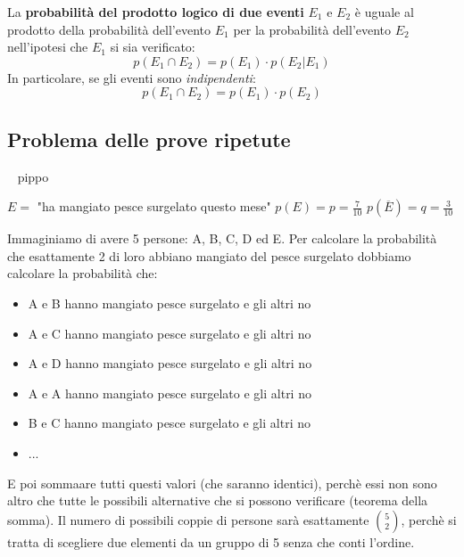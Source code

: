 \documentclass{article}     %
\begin{document}
                \begin{shadedTheorem}
                    La \textbf{probabilità del prodotto logico di due eventi} $E_1$ e $E_2$ è uguale al prodotto della probabilità dell'evento $E_1$ per la probabilità dell'evento $E_2$ nell'ipotesi che $E_1$ si sia verificato:
                    \[p(E_1\cap E_2)=p(E_1)\cdot p(E_2|E_1)\]
                    In particolare, se gli eventi sono \textit{indipendenti}:
                    \[p(E_1\cap E_2)=p(E_1)\cdot p(E_2)\]
                \end{shadedTheorem}

            \subsection{Problema delle prove ripetute}~
            pippo
                \begin{ex}
                    \noindent
                $E=$ "ha mangiato pesce surgelato questo mese" \qquad
                $p(E)=p=\frac{7}{10}$ \qquad
                $p(\overline{E})=q=\frac{3}{10}$

                Immaginiamo di avere 5 persone: A, B, C, D ed E. Per calcolare la probabilità che esattamente 2 di loro abbiano mangiato del pesce surgelato dobbiamo calcolare la probabilità che:
                \begin{itemize}
                    \item A e B hanno mangiato pesce surgelato e gli altri no
                    \item A e C hanno mangiato pesce surgelato e gli altri no
                    \item A e D hanno mangiato pesce surgelato e gli altri no
                    \item A e A hanno mangiato pesce surgelato e gli altri no
                    \item B e C hanno mangiato pesce surgelato e gli altri no
                    \item ...
                \end{itemize}
                E poi sommaare tutti questi valori (che saranno identici), perchè essi non sono altro che tutte le possibili alternative che si possono verificare (teorema della somma). Il numero di possibili coppie di persone sarà esattamente $\binom{5}{2}$, perchè si tratta di scegliere due elementi da un gruppo di 5 senza che conti l'ordine. 


\end{ex}
\end{document}
